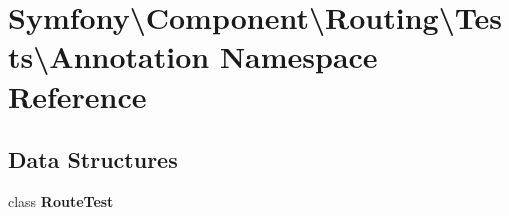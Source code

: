 \section{Symfony\textbackslash{}Component\textbackslash{}Routing\textbackslash{}Tests\textbackslash{}Annotation Namespace Reference}
\label{namespace_symfony_1_1_component_1_1_routing_1_1_tests_1_1_annotation}
\subsection*{Data Structures}
\begin{DoxyCompactItemize}
\item 
class {\bf Route\+Test}
\end{DoxyCompactItemize}
